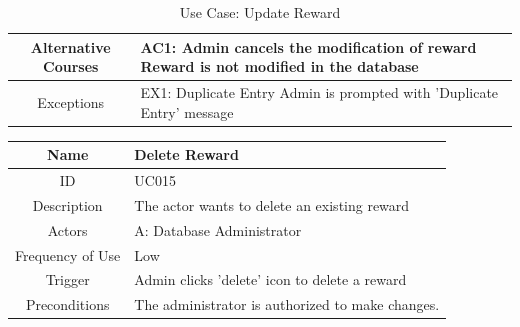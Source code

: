 \documentclass[12pt, a4paper, oneside]{article}
\begin{document}
\begin{table}[H]
\begin{tabularx}{\linewidth}{|c|X|}
Alternative Courses & AC1: Admin cancels the modification of reward \newline Reward is not modified in the database                                                                                             \\ \hline
Exceptions          & EX1: Duplicate Entry \newline Admin is prompted with 'Duplicate Entry' message \\ \hline
\end{tabularx}
\caption{Use Case: Update Reward}
\label{uc-update-reward}
\end{table}

\begin{table}[H]
\begin{tabularx}{\linewidth}{|c|X|}
\hline
Name                & Delete Reward                                                                                                                                                                                                                      \\ \hline
ID                  & UC015                                                                                                                                                                                                                       \\ \hline
Description         & The actor wants to delete an existing reward                                                                                                                                                    \\ \hline
Actors              & A: Database Administrator                                                                                                                                                                                                 \\ \hline
Frequency of Use    & Low                                                                                                                                                                                                                    \\ \hline
Trigger             & Admin clicks 'delete' icon to delete a reward                                                                                                                                                                                           \\ \hline
Preconditions       & The administrator is authorized to make changes.                                                                                                                                                                                     \\ \hline

\end{tabularx}
\end{table}
\end{document}
